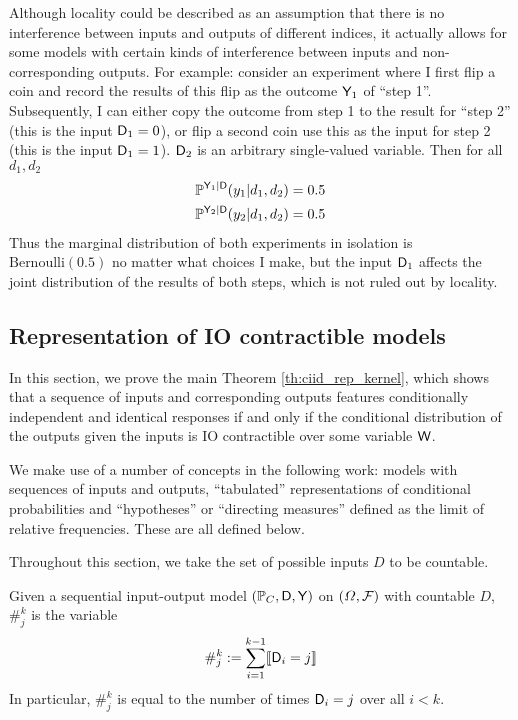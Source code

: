 Although locality could be described as an assumption that there is no interference between inputs and outputs of different indices, it actually allows for some models with certain kinds of interference between inputs and non-corresponding outputs. For example: consider an experiment where I first flip a coin and record the results of this flip as the outcome $\mathsf{Y}_1$ of ``step 1''. Subsequently, I can either copy the outcome from step 1 to the result for ``step 2'' (this is the input $\mathsf{D}_1=0$), or flip a second coin use this as the input for step 2 (this is the input $\mathsf{D}_1=1$). $\mathsf{D}_2$ is an arbitrary single-valued variable. Then for all $d_1, d_2$
\begin{align}
    \mathbb{P}^{\mathsf{Y}_1|\mathsf{D}}(y_1|d_1,d_2) &= 0.5\\
    \mathbb{P}^{\mathsf{Y}_2|\mathsf{D}}(y_2|d_1,d_2) &= 0.5
\end{align}
Thus the marginal distribution of both experiments in isolation is $\text{Bernoulli}(0.5)$ no matter what choices I make, but the input $\mathsf{D}_1$ affects the joint distribution of the results of both steps, which is not ruled out by locality.

\subsection[Representation of IO contractible models]{Representation of IO contractible models}\label{sec:rep_theorem}

In this section, we prove the main Theorem \ref{th:ciid_rep_kernel}, which shows that a sequence of inputs and corresponding outputs features conditionally independent and identical responses if and only if the conditional distribution of the outputs given the inputs is IO contractible over some variable $\mathsf{W}$.

We make use of a number of concepts in the following work: models with sequences of inputs and outputs, ``tabulated'' representations of conditional probabilities and ``hypotheses'' or ``directing measures'' defined as the limit of relative frequencies. These are all defined below.

Throughout this section, we take the set of possible inputs $D$ to be countable.

\begin{definition}\label{def:count_of_inputs}
Given a sequential input-output model $(\mathbb{P}_C,\mathsf{D},\mathsf{Y})$ on $(\Omega,\mathcal{F})$ with countable $D$, $\#_{j}^k$ is the variable
\begin{align}
    \#_{j}^k := \sum_{i=1}^{k-1} \llbracket \mathsf{D}_i = j \rrbracket
\end{align}
In particular, $\#_{j}^k$ is equal to the number of times $\mathsf{D}_i=j$ over all $i<k$.
\end{definition}

